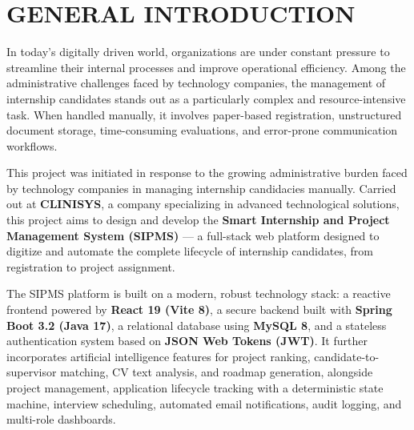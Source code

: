 \chapter*{GENERAL INTRODUCTION}
\adjustmtc
\thispagestyle{MyStyle}

\par
In today's digitally driven world, organizations are under constant pressure to streamline their internal processes and improve operational efficiency. Among the administrative challenges faced by technology companies, the management of internship candidates stands out as a particularly complex and resource-intensive task. When handled manually, it involves paper-based registration, unstructured document storage, time-consuming evaluations, and error-prone communication workflows.

\par
This project was initiated in response to the growing administrative burden faced by technology companies in managing internship candidacies manually. Carried out at \textbf{CLINISYS}, a company specializing in advanced technological solutions, this project aims to design and develop the \textbf{Smart Internship and Project Management System (SIPMS)} — a full-stack web platform designed to digitize and automate the complete lifecycle of internship candidates, from registration to project assignment.

\par
The SIPMS platform is built on a modern, robust technology stack: a reactive frontend powered by \textbf{React 19 (Vite 8)}, a secure backend built with \textbf{Spring Boot 3.2 (Java 17)}, a relational database using \textbf{MySQL 8}, and a stateless authentication system based on \textbf{JSON Web Tokens (JWT)}. It further incorporates artificial intelligence features for project ranking, candidate-to-supervisor matching, CV text analysis, and roadmap generation, alongside project management, application lifecycle tracking with a deterministic state machine, interview scheduling, automated email notifications, audit logging, and multi-role dashboards.

